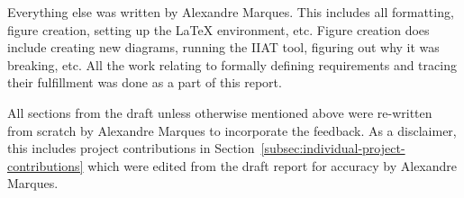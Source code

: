 Everything else was written by Alexandre Marques.
This includes all formatting, figure creation, setting up the LaTeX environment, etc.
Figure creation does include creating new diagrams, running the IIAT tool,
figuring out why it was breaking, etc.
All the work relating to formally defining requirements and tracing their fulfillment was done as a part of this report.

All sections from the draft unless otherwise mentioned above were re-written from scratch by Alexandre Marques to incorporate the feedback.
As a disclaimer, this includes project contributions in Section~\ref{subsec:individual-project-contributions}
which were edited from the draft report for accuracy by Alexandre Marques.